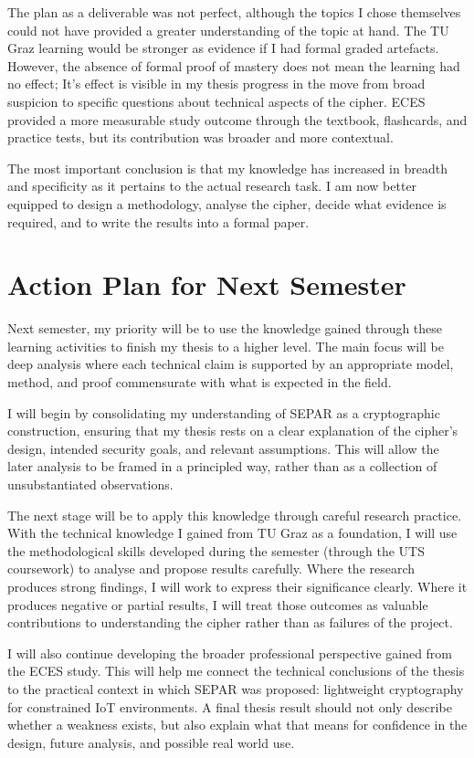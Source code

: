 \documentclass[11pt]{article}
\begin{document}
The plan as a deliverable was not perfect, although the topics I chose themselves could not have provided a greater understanding of the topic at hand. The TU Graz learning would be stronger as evidence if I had formal graded artefacts. However, the absence of formal proof of mastery does not mean the learning had no effect; It's effect is visible in my thesis progress in the move from broad suspicion to specific questions about technical aspects of the cipher. ECES provided a more measurable study outcome through the textbook, flashcards, and practice tests, but its contribution was broader and more contextual.

The most important conclusion is that my knowledge has increased in breadth and specificity as it pertains to the actual research task. I am now better equipped to design a methodology, analyse the cipher, decide what evidence is required, and to write the results into a formal paper.

\section*{Action Plan for Next Semester}

Next semester, my priority will be to use the knowledge gained through these learning activities to finish my thesis to a higher level. The main focus will be deep analysis where each technical claim is supported by an appropriate model, method, and proof commensurate with what is expected in the field.

I will begin by consolidating my understanding of SEPAR as a cryptographic construction, ensuring that my thesis rests on a clear explanation of the cipher's design, intended security goals, and relevant assumptions. This will allow the later analysis to be framed in a principled way, rather than as a collection of unsubstantiated observations.

The next stage will be to apply this knowledge through careful research practice. With the technical knowledge I gained from TU Graz as a foundation, I will use the methodological skills developed during the semester (through the UTS coursework) to analyse and propose results carefully. Where the research produces strong findings, I will work to express their significance clearly. Where it produces negative or partial results, I will treat those outcomes as valuable contributions to understanding the cipher rather than as failures of the project.

I will also continue developing the broader professional perspective gained from the ECES study. This will help me connect the technical conclusions of the thesis to the practical context in which SEPAR was proposed: lightweight cryptography for constrained IoT environments. A final thesis result should not only describe whether a weakness exists, but also explain what that means for confidence in the design, future analysis, and possible real world use.
\end{document}
